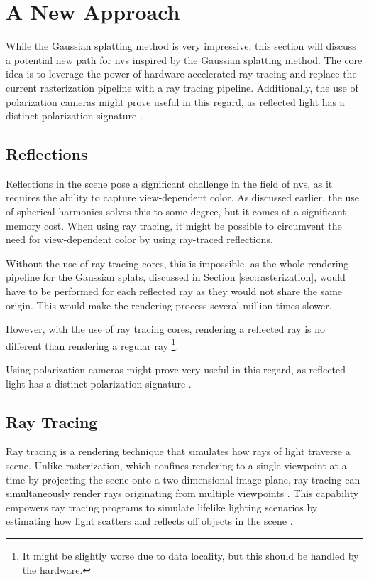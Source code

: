 \section{A New Approach}
While the Gaussian splatting method is very impressive, this section will discuss a potential new path for \gls{nvs} inspired by the Gaussian splatting method.
The core idea is to leverage the power of hardware-accelerated ray tracing and replace the current rasterization pipeline with a ray tracing pipeline.
Additionally, the use of polarization cameras might prove useful in this regard, as reflected light has a distinct polarization signature \cite{lingUniversityPhysicsVolume2016}.

\subsection{Reflections}
Reflections in the scene pose a significant challenge in the field of \gls{nvs}, as it requires the ability to capture view-dependent color.
As discussed earlier, the use of spherical harmonics solves this to some degree, but it comes at a significant memory cost.
When using ray tracing, it might be possible to circumvent the need for view-dependent color by using ray-traced reflections.

Without the use of ray tracing cores, this is impossible, as the whole rendering pipeline for the Gaussian splats, discussed in Section \ref{sec:rasterization}, would have to be performed for each reflected ray as they would not share the same origin.
This would make the rendering process several million times slower.

However, with the use of ray tracing cores, rendering a reflected ray is no different than rendering a regular ray \footnote{It might be slightly worse due to data locality, but this should be handled by the hardware.}.


Using polarization cameras might prove very useful in this regard, as reflected light has a distinct polarization signature \cite{lingUniversityPhysicsVolume2016}.

\subsection{Ray Tracing}
Ray tracing is a rendering technique that simulates how rays of light traverse a scene.
Unlike rasterization, which confines rendering to a single viewpoint at a time by projecting the scene onto a two-dimensional image plane, ray tracing can simultaneously render rays originating from multiple viewpoints \cite{caulfieldWhatPathTracing2022}.
This capability empowers ray tracing programs to simulate lifelike lighting scenarios by estimating how light scatters and reflects off objects in the scene \cite{caulfieldWhatPathTracing2022}.

